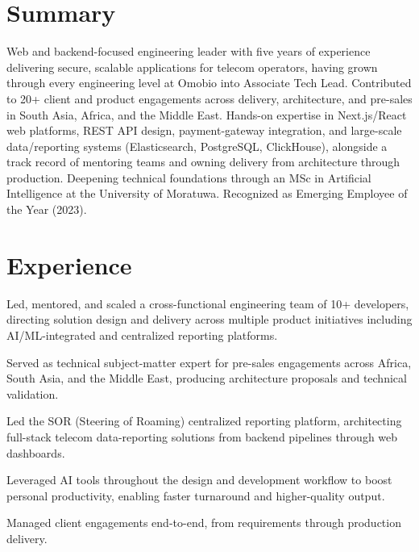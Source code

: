 \documentclass[10.5pt]{article}
\begin{document}

\section*{Summary}
Web and backend-focused engineering leader with five years of experience delivering secure, scalable applications for telecom operators, having grown through every engineering level at Omobio into Associate Tech Lead. Contributed to 20+ client and product engagements across delivery, architecture, and pre-sales in South Asia, Africa, and the Middle East. Hands-on expertise in Next.js/React web platforms, REST API design, payment-gateway integration, and large-scale data/reporting systems (Elasticsearch, PostgreSQL, ClickHouse), alongside a track record of mentoring teams and owning delivery from architecture through production. Deepening technical foundations through an MSc in Artificial Intelligence at the University of Moratuwa. Recognized as Emerging Employee of the Year (2023).

\section*{Experience}

\begin{cvitems}
  \item Led, mentored, and scaled a cross-functional engineering team of 10+ developers, directing solution design and delivery across multiple product initiatives including AI/ML-integrated and centralized reporting platforms.
  \item Served as technical subject-matter expert for pre-sales engagements across Africa, South Asia, and the Middle East, producing architecture proposals and technical validation.
  \item Led the SOR (Steering of Roaming) centralized reporting platform, architecting full-stack telecom data-reporting solutions from backend pipelines through web dashboards.
  \item Leveraged AI tools throughout the design and development workflow to boost personal productivity, enabling faster turnaround and higher-quality output.
  \item Managed client engagements end-to-end, from requirements through production delivery.
\end{cvitems}
\end{document}
